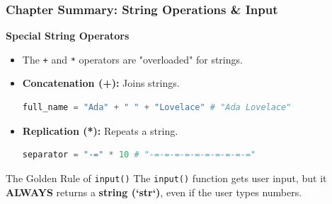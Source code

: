 \documentclass{beamer}
\begin{document}
\begin{frame}[fragile]
    \frametitle{Chapter Summary: String Operations \& Input}
    \textbf{Special String Operators}
    \begin{itemize}
        \item The \texttt{+} and \texttt{*} operators are "overloaded" for strings.
        \item \textbf{Concatenation (+):} Joins strings.
        \begin{lstlisting}[language=Python]
full_name = "Ada" + " " + "Lovelace" # "Ada Lovelace"
        \end{lstlisting}
        \item \textbf{Replication (*):} Repeats a string.
        \begin{lstlisting}[language=Python]
separator = "-=" * 10 # "-=-=-=-=-=-=-=-=-=-="
        \end{lstlisting}
    \end{itemize}
    
    \vspace{1em}
    
    \begin{alertblock}{The Golden Rule of \texttt{input()}}
        The \texttt{input()} function gets user input, but it \textbf{ALWAYS} returns a \textbf{string (`str`)}, even if the user types numbers.
    \end{alertblock}
\end{frame}
\end{document}
